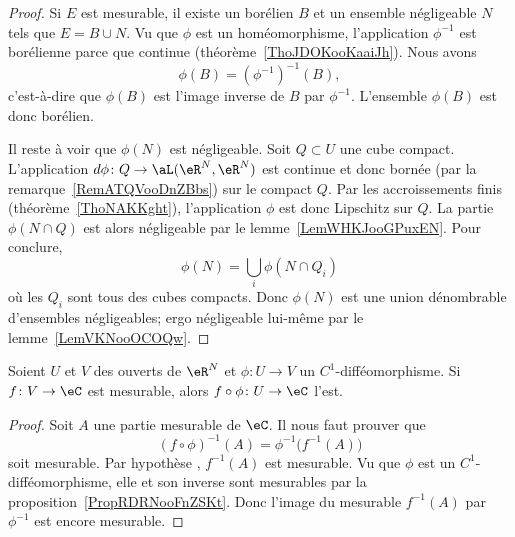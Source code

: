 \begin{proof}
    Si \( E\) est mesurable, il existe un borélien \( B\) et un ensemble négligeable \( N\) tels que \( E=B\cup N\). Vu que \( \phi\) est un homéomorphisme, l'application \( \phi^{-1}\) est borélienne parce que continue (théorème~\ref{ThoJDOKooKaaiJh}). Nous avons
    \begin{equation}
        \phi(B)=(\phi^{-1})^{-1}(B),
    \end{equation}
    c'est-à-dire que \( \phi(B)\) est l'image inverse de \( B\) par \( \phi^{-1}\). L'ensemble \( \phi(B)\) est donc borélien.

    Il reste à voir que \( \phi(N)\) est négligeable. Soit \( Q\subset U\) une cube compact. L'application \( d\phi\colon Q\to \aL(\eR^N,\eR^N)\) est continue et donc bornée (par la remarque~\ref{RemATQVooDnZBbs}) sur le compact \( Q\). Par les accroissements finis (théorème~\ref{ThoNAKKght}), l'application \( \phi\) est donc Lipschitz sur \( Q\). La partie \( \phi(N\cap Q)\) est alors négligeable par le lemme~\ref{LemWHKJooGPuxEN}. Pour conclure,
    \begin{equation}
        \phi(N)=\bigcup_i\phi(N\cap Q_i)
    \end{equation}
    où les \( Q_i\) sont tous des cubes compacts. Donc \( \phi(N)\) est une union dénombrable d'ensembles négligeables; ergo négligeable lui-même par le lemme~\ref{LemVKNooOCOQw}.
\end{proof}

\begin{proposition}
    Soient \( U\) et \( V\) des ouverts de \( \eR^N\) et \( \phi\colon U\to V\) un \( C^1\)-difféomorphisme. Si \( f\colon V\to \eC\) est mesurable, alors \(f\circ \phi\colon U\to \eC\) l'est.
\end{proposition}

\begin{proof}
    Soit \( A\) une partie mesurable de \( \eC\). Il nous faut prouver que
    \begin{equation}
        (f\circ\phi)^{-1}(A)=\phi^{-1}\big( f^{-1}(A) \big)
    \end{equation}
    soit mesurable. Par hypothèse , \( f^{-1}(A)\) est mesurable. Vu que \( \phi\) est un \( C^1\)-difféomorphisme, elle et son inverse sont mesurables par la proposition~\ref{PropRDRNooFnZSKt}. Donc l'image du mesurable \( f^{-1}(A)\) par \( \phi^{-1}\) est encore mesurable.
\end{proof}

